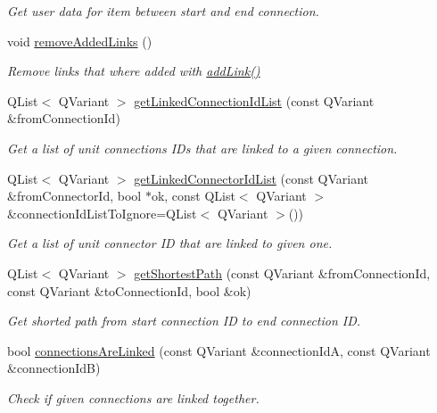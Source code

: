 \begin{DoxyCompactItemize}
\begin{DoxyCompactList}\small\item\em Get user data for item between start and end connection. \end{DoxyCompactList}\item 
void \hyperlink{classmdt_cl_path_graph_a5bee589e7c93681bf9325fd9bc999eb9}{remove\-Added\-Links} ()
\begin{DoxyCompactList}\small\item\em Remove links that where added with \hyperlink{classmdt_cl_path_graph_a14a5580402b273eb6707939ee122fa95}{add\-Link()} \end{DoxyCompactList}\item 
Q\-List$<$ Q\-Variant $>$ \hyperlink{classmdt_cl_path_graph_a09b3b342fe09d1afdbc88c8c683ab016}{get\-Linked\-Connection\-Id\-List} (const Q\-Variant \&from\-Connection\-Id)
\begin{DoxyCompactList}\small\item\em Get a list of unit connections I\-Ds that are linked to a given connection. \end{DoxyCompactList}\item 
Q\-List$<$ Q\-Variant $>$ \hyperlink{classmdt_cl_path_graph_af5484b6efa4b9d9162de3dd1834fcb41}{get\-Linked\-Connector\-Id\-List} (const Q\-Variant \&from\-Connector\-Id, bool $\ast$ok, const Q\-List$<$ Q\-Variant $>$ \&connection\-Id\-List\-To\-Ignore=Q\-List$<$ Q\-Variant $>$())
\begin{DoxyCompactList}\small\item\em Get a list of unit connector I\-D that are linked to given one. \end{DoxyCompactList}\item 
Q\-List$<$ Q\-Variant $>$ \hyperlink{classmdt_cl_path_graph_afa0a3c6b9fd56cfd943a3bc2480c1ce0}{get\-Shortest\-Path} (const Q\-Variant \&from\-Connection\-Id, const Q\-Variant \&to\-Connection\-Id, bool \&ok)
\begin{DoxyCompactList}\small\item\em Get shorted path from start connection I\-D to end connection I\-D. \end{DoxyCompactList}\item 
bool \hyperlink{classmdt_cl_path_graph_a8714c63f42c3bfbda6432ef2f59fe186}{connections\-Are\-Linked} (const Q\-Variant \&connection\-Id\-A, const Q\-Variant \&connection\-Id\-B)
\begin{DoxyCompactList}\small\item\em Check if given connections are linked together. \end{DoxyCompactList}\item 

\end{DoxyCompactItemize}

